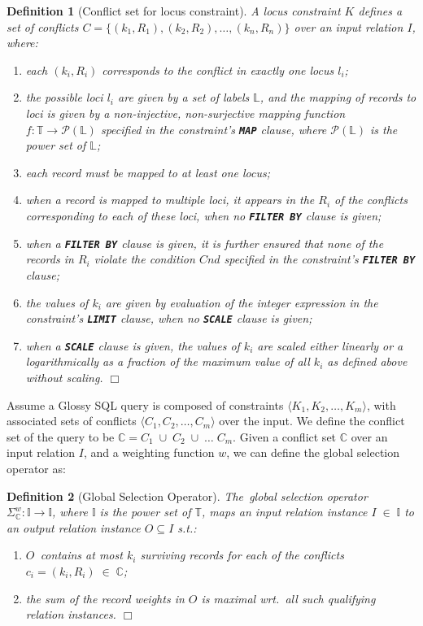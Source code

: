 \documentclass[11pt, oneside]{report}
\newtheorem{definition}{Definition}
\newcommand{\mathendbox}{\hfill$\Box$}
\begin{document}
\begin{definition}[Conflict set for locus constraint]
A locus constraint $K$ defines a set of conflicts $C = \{ (k_1, R_1), (k_2, R_2), \ldots, (k_n, R_n) \}$ over an input relation $I$, where:
\begin{enumerate}[label=(\alph*)]
\item each $(k_i, R_i)$ corresponds to the conflict in exactly one locus $l_i$;
\item the possible loci $l_i$ are given by a set of labels $\mathbb{L}$, and the mapping of records to loci is given by a non-injective, non-surjective mapping function $f: \mathbb{T} \rightarrow \mathcal P (\mathbb{L})$ specified in the constraint's \textbf{\texttt{MAP}} clause, where $\mathcal P (\mathbb{L})$ is the power set of $\mathbb{L}$;
\item each record must be mapped to at least one locus;
\item when a record is mapped to multiple loci, it appears in the $R_i$ of the conflicts corresponding to each of these loci, when no \textbf{\texttt{FILTER BY}} clause is given;
\item when a \textbf{\texttt{FILTER BY}} clause is given, it is further ensured that none of the records in $R_i$ violate the condition $Cnd$ specified in the constraint's \textbf{\texttt{FILTER BY}} clause;
\item the values of $k_i$ are given by evaluation of the integer expression in the constraint's \textbf{\texttt{LIMIT}} clause, when no \textbf{\texttt{SCALE}} clause is given;
\item when a \textbf{\texttt{SCALE}} clause is given, the values of $k_i$ are scaled either linearly or a logarithmically as a fraction of the maximum value of all $k_i$ as defined above without scaling. 
\mathendbox 
\end{enumerate}
\label{def:conflict:set:locus}
\end{definition} 
 
Assume a Glossy SQL query is composed of constraints $\langle K_1, K_2, \ldots, K_m\rangle$, with associated sets of conflicts $\langle C_1, C_2, \ldots, C_m\rangle$ over the input. We define the conflict set of the query to be $\mathbb{C} = C_1 \;\cup\; C_2 \;\cup\; \ldots \; C_m$. Given a conflict set $\mathbb{C}$ over an input relation $I$, and a weighting function $w$, we can define the global selection operator as:
 
 \begin{definition}[Global Selection Operator]
The~global selection operator $\Sigma_{\mathbb{C}}^{w}: \mathbb{I} \rightarrow \mathbb{I}$, where $\mathbb{I}$ is the power set of $\mathbb{T}$, maps an input relation instance $I \; \in \; \mathbb{I}$ to an output relation instance $O \subseteq I$ s.t.:
\begin{enumerate}[label=(\alph*)]
\item $O$~contains at most $k_{i}$ surviving records for each of the conflicts $c_{i} = (k_{i},R_{i}) \; \in \; \mathbb{C}$;
\item the sum of the record weights in $O$ is maximal wrt.~all such qualifying relation instances.  \mathendbox 
\end{enumerate}
 \end{definition} 
\end{document}
